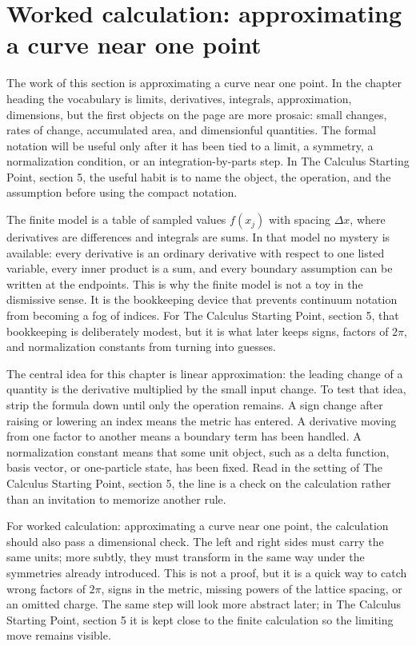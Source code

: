\section{Worked calculation: approximating a curve near one point}

The work of this section is approximating a curve near one point.  In the chapter heading the vocabulary is limits, derivatives, integrals, approximation, dimensions, but the first objects on the page are more prosaic: small changes, rates of change, accumulated area, and dimensionful quantities.  The formal notation will be useful only after it has been tied to a limit, a symmetry, a normalization condition, or an integration-by-parts step.  In The Calculus Starting Point, section 5, the useful habit is to name the object, the operation, and the assumption before using the compact notation.

The finite model is a table of sampled values \(f(x_j)\) with spacing \(\Delta x\), where derivatives are differences and integrals are sums.  In that model no mystery is available: every derivative is an ordinary derivative with respect to one listed variable, every inner product is a sum, and every boundary assumption can be written at the endpoints.  This is why the finite model is not a toy in the dismissive sense.  It is the bookkeeping device that prevents continuum notation from becoming a fog of indices.  For The Calculus Starting Point, section 5, that bookkeeping is deliberately modest, but it is what later keeps signs, factors of \(2\pi\), and normalization constants from turning into guesses.

The central idea for this chapter is linear approximation: the leading change of a quantity is the derivative multiplied by the small input change.  To test that idea, strip the formula down until only the operation remains.  A sign change after raising or lowering an index means the metric has entered.  A derivative moving from one factor to another means a boundary term has been handled.  A normalization constant means that some unit object, such as a delta function, basis vector, or one-particle state, has been fixed.  Read in the setting of The Calculus Starting Point, section 5, the line is a check on the calculation rather than an invitation to memorize another rule.

For worked calculation: approximating a curve near one point, the calculation should also pass a dimensional check.  The left and right sides must carry the same units; more subtly, they must transform in the same way under the symmetries already introduced.  This is not a proof, but it is a quick way to catch wrong factors of \(2\pi\), signs in the metric, missing powers of the lattice spacing, or an omitted charge.  The same step will look more abstract later; in The Calculus Starting Point, section 5 it is kept close to the finite calculation so the limiting move remains visible.

